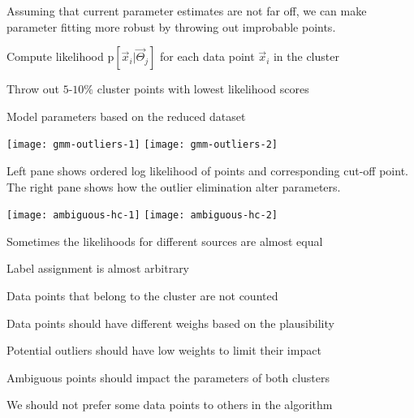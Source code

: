 \documentclass[landscape,footrule]{foils}
\newcommand{\pd}[1]{\mathrm{p}[#1]}
\begin{document}
Assuming that current parameter estimates are not far off, we can make parameter fitting more robust by throwing out improbable points.
\begin{triangles}
\item Compute likelihood $\pd{\vec{x}_i|\vec{\Theta}_j}$  for each data point $\vec{x}_i$ in the cluster
\item Throw out $5$-$10\%$ cluster points with lowest likelihood scores
\item Model parameters based on the reduced dataset 
\end{triangles}


\begin{center}
\hspace*{-1cm}
\texttt{[image: gmm-outliers-1]}\hspace*{-2cm}
\texttt{[image: gmm-outliers-2]}
\end{center}
\vspace*{-2cm}
Left pane shows ordered log likelihood of points and corresponding cut-off point. The right pane shows how the outlier elimination alter parameters. 



\begin{center}
\texttt{[image: ambiguous-hc-1]}\hspace*{-2cm}
\texttt{[image: ambiguous-hc-2]}
\end{center}
\vspace*{-2cm}

Sometimes the likelihoods for different sources are almost equal
\begin{triangles}
\item Label assignment is almost arbitrary 
\item Data points that belong to the cluster are not counted
\end{triangles}


Data points should have different weighs based on the plausibility 
\begin{triangles}
\item Potential outliers should have low weights to limit their impact
\item Ambiguous points should impact the parameters of both clusters 
\item We should not prefer some data points to others in the algorithm
\end{triangles} 
\vspace*{2cm}
\end{document}
